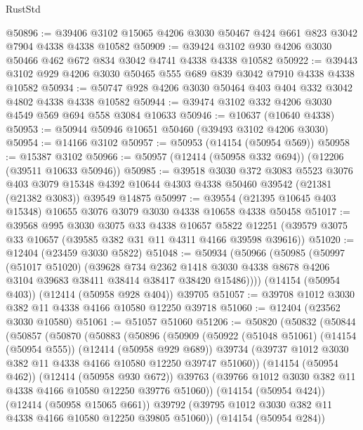 \begin{lexlean}{RustStd}
\begin{coremodule}
{\begin{coremodule}
{{{{{{{{{{{{{{{{{{{{{{{{{{{{{{{{{{{{{{{{{{{{{{{{{{@50896 := @39406 @3102 @15065 @4206 @3030 @50467 @424 @661 @823 @3042 @7904 @4338 @4338 @10582
@50909 := @39424 @3102 @930 @4206 @3030 @50466 @462 @672 @834 @3042 @4741 @4338 @4338 @10582
@50922 := @39443 @3102 @929 @4206 @3030 @50465 @555 @689 @839 @3042 @7910 @4338 @4338 @10582
@50934 := @50747 @928 @4206 @3030 @50464 @403 @404 @332 @3042 @4802 @4338 @4338 @10582
@50944 := @39474 @3102 @332 @4206 @3030 @4549 @569 @694 @558 @3084 @10633
@50946 := @10637 (@10640 @4338)
@50953 := @50944 @50946 @10651 @50460 (@39493 @3102 @4206 @3030)
@50954 := @14166 @3102
@50957 := @50953 (@14154 (@50954 @569))
@50958 := @15387 @3102
@50966 := @50957 (@12414 (@50958 @332 @694)) (@12206 (@39511 @10633 @50946))
@50985 := @39518
    @3030
    @372
    @3083
    @5523
    @3076
    @403
    @3079
    @15348
    @4392
    @10644
    @4303
    @4338
    @50460
    @39542
    (@21381 (@21382 @3083))
    @39549
    @14875
@50997 := @39554 (@21395 @10645 @403 @15348) @10655 @3076 @3079 @3030 @4338 @10658 @4338 @50458
@51017 := @39568
    @995
    @3030
    @3075
    @33
    @4338
    @10657
    @5822
    @12251
    (@39579 @3075 @33 @10657 (@39585 @382 @31 @11 @4311 @4166 @39598 @39616))
@51020 := @12404 (@23459 @3030 @5822)
@51048 := @50934
    (@50966
      (@50985
        (@50997
          (@51017 @51020)
          (@39628
            @734
            @2362
            @1418
            @3030
            @4338
            @8678
            @4206
            @3104
            @39683
            @38411
            @38414
            @38417
            @38420
            @15486))))
    (@14154 (@50954 @403))
    (@12414 (@50958 @928 @404))
    @39705
@51057 := @39708 @1012 @3030 @382 @11 @4338 @4166 @10580 @12250 @39718
@51060 := @12404 (@23562 @3030 @10580)
@51061 := @51057 @51060
@51206 := @50820
    (@50832
      (@50844
        (@50857
          (@50870
            (@50883
              (@50896
                (@50909
                  (@50922
                    (@51048 @51061)
                    (@14154 (@50954 @555))
                    (@12414 (@50958 @929 @689))
                    @39734
                    (@39737 @1012 @3030 @382 @11 @4338 @4166 @10580 @12250 @39747 @51060))
                  (@14154 (@50954 @462))
                  (@12414 (@50958 @930 @672))
                  @39763
                  (@39766 @1012 @3030 @382 @11 @4338 @4166 @10580 @12250 @39776 @51060))
                (@14154 (@50954 @424))
                (@12414 (@50958 @15065 @661))
                @39792
                (@39795 @1012 @3030 @382 @11 @4338 @4166 @10580 @12250 @39805 @51060))
              (@14154 (@50954 @284))
}}}}}}}}}}}}}}}}}}}}}}}}}}}}}}}}}}}}}}}}}}}}}}}}}}
\end{coremodule}}
\end{coremodule}
\end{lexlean}

